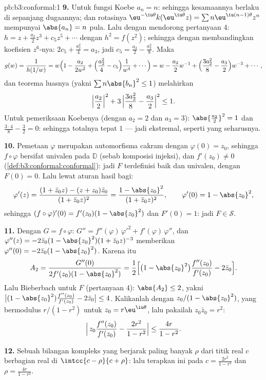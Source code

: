 \begin{solution}{pb:b3:conformal:1}
\textbf{9.} Untuk fungsi Koebe $a_n = n$: sehingga kesamaannya berlaku
di sepanjang dugaannya; dan rotasinya
$\eu^{-\iu\theta}k(\eu^{\iu\theta}z) = \sum
n\eu^{\iu(n-1)\theta}z^n$ mempunyai $\abs{a_n} = n$ pula. Lalu dengan mendorong
pertanyaan 4: $h = z + \frac{a_2}2z^3 + c_5z^5 + \cdots$ dengan
$h^2 = f(z^2)$; sehingga dengan membandingkan koefisien $z^6$-nya: $2c_5 +
\frac{a_2^2}4 = a_3$, jadi $c_5 = \frac{a_3}2 -
\frac{a_2^2}8$. Maka
\[
g(w) = \frac1{h(1/w)} = w\Bigl(1 - \frac{a_2}{2w^2} +
\Bigl(\frac{a_2^2}4 - c_5\Bigr)\frac1{w^4} + \cdots\Bigr)
= w - \frac{a_2}2w^{-1} + \Bigl(\frac{3a_2^2}8 -
\frac{a_3}2\Bigr)w^{-3} + \cdots,
\]
dan teorema luasnya (yakni $\sum n\abs{b_n}^2 \leq 1$) melahirkan
\[
\Bigl|\frac{a_2}2\Bigr|^2 + 3\,\Bigl|\frac{3a_2^2}8 -
\frac{a_3}2\Bigr|^2 \leq 1 .
\]
Untuk pemeriksaan Koebenya (dengan $a_2 = 2$ dan $a_3 = 3$): $\abs{\frac{a_2}2}^2 = 1$
dan $\frac{3\cdot4}8 - \frac32 = 0$: sehingga totalnya tepat $1$ ---
jadi ekstremal, seperti yang seharusnya.

\textbf{10.} Pemetaan $\varphi$ merupakan automorfisma cakram dengan
$\varphi(0) = z_0$, sehingga $f\circ\varphi$ bersifat univalen pada
$\mathbb D$ (sebab komposisi injeksi), dan $f'(z_0) \neq
0$ (\cref{def:b3:conformal:conformal}): jadi $F$ terdefinisi baik
dan univalen, dengan $F(0) = 0$. Lalu lewat aturan hasil bagi:
\[
\varphi'(z) = \frac{(1 + \bar z_0z) - (z + z_0)\bar z_0}
{(1 + \bar z_0z)^2}
= \frac{1 - \abs{z_0}^2}{(1 + \bar z_0z)^2},
\qquad \varphi'(0) = 1 - \abs{z_0}^2 ,
\]
sehingga $(f\circ\varphi)'(0) = f'(z_0)(1 - \abs{z_0}^2)$ dan
$F'(0) = 1$: jadi $F \in \mathcal S$.

\textbf{11.} Dengan $G = f\circ\varphi$: $G'' =
f''(\varphi)\,\varphi'^2 + f'(\varphi)\,\varphi''$, dan
$\varphi''(z) = -2\bar z_0(1 - \abs{z_0}^2)(1 + \bar
z_0z)^{-3}$ memberikan $\varphi''(0) = -2\bar z_0(1 -
\abs{z_0}^2)$. Karena itu
\[
A_2 = \frac{G''(0)}{2f'(z_0)(1 - \abs{z_0}^2)}
= \frac12\Bigl[\bigl(1 - \abs{z_0}^2\bigr)
\frac{f''(z_0)}{f'(z_0)} - 2\bar z_0\Bigr] .
\]
Lalu Bieberbach untuk $F$ (pertanyaan 4): $\abs{A_2} \leq 2$, yakni
$\bigl|(1 - \abs{z_0}^2)\frac{f''(z_0)}{f'(z_0)} - 2\bar
z_0\bigr| \leq 4$. Kalikanlah dengan
$z_0/(1 - \abs{z_0}^2)$, yang bermodulus
$r/(1 - r^2)$ untuk $z_0 = r\eu^{\iu\theta}$, lalu pakailah $z_0\bar
z_0 = r^2$:
\[
\Bigl|\,z_0\frac{f''(z_0)}{f'(z_0)} -
\frac{2r^2}{1 - r^2}\Bigr| \leq \frac{4r}{1 - r^2} .
\]

\textbf{12.} Sebuah bilangan kompleks yang berjarak paling banyak $\rho$ dari
titik real $c$ berbagian real di $\intcc{c - \rho}{c +
\rho}$: lalu terapkan ini pada $c = \frac{2r^2}{1-r^2}$ dan $\rho =
\frac{4r}{1-r^2}$.


\end{solution}
